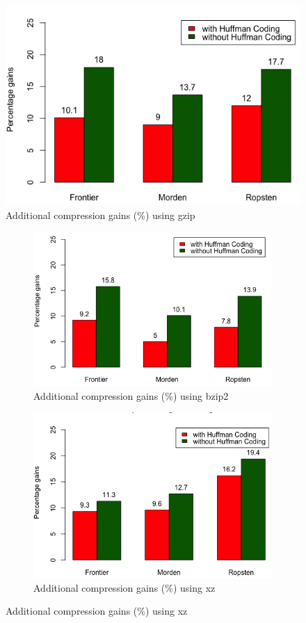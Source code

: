 \begin{figure}[H]
	\includegraphics[scale=0.45]{plots/gzip}
	\caption{Additional compression gains (\%) using gzip}
	\label{fig:gzip}
\end{figure}
\begin{figure}[H]
	\begin{subfigure}{0.52\textwidth}
	\includegraphics[scale=0.45]{plots/bzip2}
	\caption{Additional compression gains (\%) using bzip2}
	\label{fig:bzip2}
\end{subfigure}
\begin{subfigure}{0.45\textwidth} 
	\includegraphics[scale=0.45]{plots/xz}
	\caption{Additional compression gains (\%) using xz}
	\label{fig:xz}
\end{subfigure}
\end{figure}
